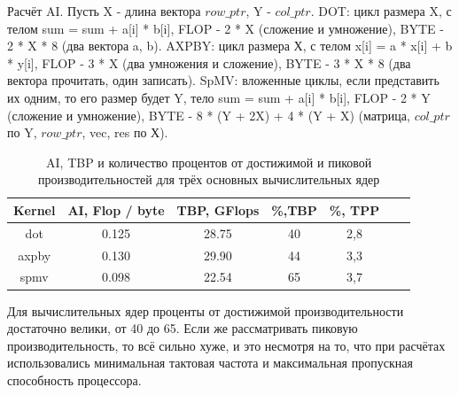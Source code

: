 	Расчёт AI. Пусть X - длина вектора \(row\_ptr\), Y - \(col\_ptr\). DOT: цикл размера X, с телом sum = sum + a[i] * b[i], FLOP - 2 * X (сложение и умножение), BYTE - 2 * X * 8 (два вектора a, b). AXPBY: цикл размера Х, с телом x[i] = a * x[i] + b * y[i], FLOP - 3 * X (два умножения и сложение), BYTE - 3 * X * 8 (два вектора прочитать, один записать). SpMV: вложенные циклы, если представить их одним, то его размер будет Y, тело sum = sum + a[i] * b[i], FLOP - 2 * Y (сложение и умножение), BYTE - 8 * (Y + 2X) + 4 * (Y + X) (матрица, \(col\_ptr\) по Y, \(row\_ptr\), vec, res по Х).
	\begin{table}[H]
		\centering
		\begin{tabular}{|c||c|c|c|c|c|c|}
			\hline
			Kernel & AI, Flop / byte & TBP, GFlops & \%,TBP & \%, TPP \\ \hline
			dot    &           0.125 &       28.75 & 40 & 2,8 \\ \hline
			axpby  &           0.130 &       29.90 & 44 & 3,3 \\ \hline
			spmv   &           0.098 &       22.54 & 65 & 3,7 \\ \hline
		\end{tabular}
		\caption{AI, TBP и количество процентов от достижимой и пиковой производительностей для трёх основных вычислительных ядер}
	\end{table}
	Для вычислительных ядер проценты от достижимой производительности достаточно велики, от 40 до 65. Если же рассматривать пиковую производительность, то всё сильно хуже, и это несмотря на то, что при расчётах использовались минимальная тактовая частота и максимальная пропускная способность процессора.

\clearpage
